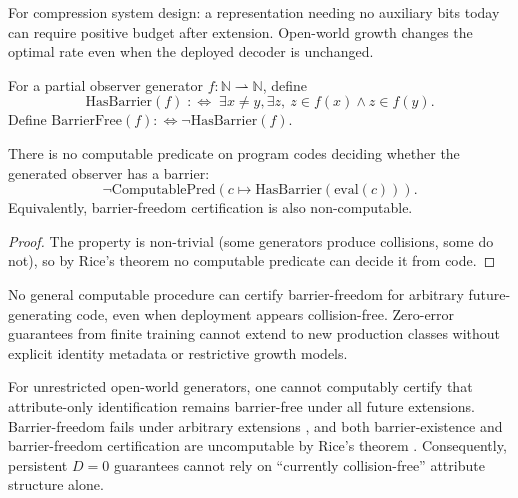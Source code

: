For compression system design: a representation needing no auxiliary bits today can require positive budget after extension. Open-world growth changes the optimal rate even when the deployed decoder is unchanged.

\begin{definition}
For a partial observer generator $f:\mathbb{N}\rightharpoonup\mathbb{N}$, define
\[
\mathrm{HasBarrier}(f)\;:\Leftrightarrow\;\exists x\neq y,\exists z,\ z\in f(x)\land z\in f(y).
\]
Define $\mathrm{BarrierFree}(f):\Leftrightarrow \neg\mathrm{HasBarrier}(f)$.
\end{definition}

\begin{theorem}\label{thm:rice-barrier}
There is no computable predicate on program codes deciding whether the generated observer has a barrier:
\[
\neg\mathrm{ComputablePred}\!\left(c\mapsto \mathrm{HasBarrier}(\mathrm{eval}(c))\right).
\]
Equivalently, barrier-freedom certification is also non-computable.
\end{theorem}

\begin{proof}
The property is non-trivial (some generators produce collisions, some do not), so by Rice's theorem no computable predicate can decide it from code.
\end{proof}

\begin{remark}
No general computable procedure can certify barrier-freedom for arbitrary future-generating code, even when deployment appears collision-free. Zero-error guarantees from finite training cannot extend to new production classes without explicit identity metadata or restrictive growth models.
\end{remark}

\begin{corollary}[Certification consequence for persistent \texorpdfstring{$D=0$}{D=0} claims]
For unrestricted open-world generators, one cannot computably certify that attribute-only identification remains barrier-free under all future extensions. Barrier-freedom fails under arbitrary extensions , and both barrier-existence and barrier-freedom certification are uncomputable by Rice's theorem . Consequently, persistent $D=0$ guarantees cannot rely on ``currently collision-free'' attribute structure alone.
\end{corollary}
